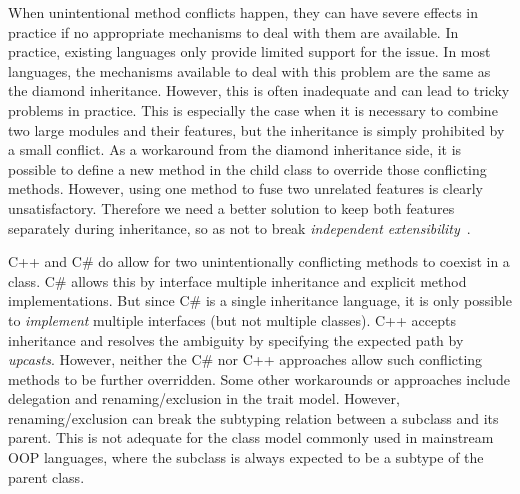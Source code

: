 
When unintentional method conflicts happen, they can have severe
effects in practice if no
appropriate mechanisms to deal with them are available. 
In practice, existing languages only provide limited support for
the issue. In most languages, the mechanisms available to deal with this problem are the same as the diamond
inheritance. However, this is often inadequate and can lead 
to tricky problems in practice. This is especially the case
when it is necessary to combine two large modules and their features,
but the inheritance is simply prohibited by a small conflict. 
As a workaround from the diamond inheritance side, it is possible to
define a new method in the child class to override those conflicting
methods. However, using one method to fuse two unrelated features
is clearly unsatisfactory. Therefore we need a better solution to keep both
features separately during inheritance, so as not to break
\emph{independent extensibility}~\cite{zenger05independentlyextensible}.

C++ and C\# do allow for two
unintentionally conflicting methods to coexist in a class. C\# allows
this by interface multiple inheritance and explicit method
implementations. But since C\# is a single inheritance language, 
it is only possible to \emph{implement} multiple interfaces (but not
multiple classes). %
C++ accepts \wordfork{} inheritance and
resolves the ambiguity by specifying the expected path by
\emph{upcasts}. However, neither the C\# nor C++ approaches allow
such conflicting methods to be further overridden. 
Some other workarounds or approaches include delegation and
renaming/exclusion in the trait model. However, renaming/exclusion 
can break the subtyping relation between a subclass and its parent.
This is not adequate for the class model commonly used in mainstream 
OOP languages, where the subclass is always expected to be a subtype 
of the parent class. 

